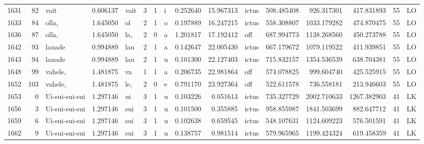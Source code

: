 \begin{tabular}{lrlrllllrrlrrrll}
1631 &          82 &             vait &  0.606137 &    vait &        3 &      1 &       i &      0.252640 &     15.967313 &  ictus &   508.485408 &   926.317301 &   417.831893 &     55 &        LO \\
1633 &          84 &            olla, &  1.645050 &      ol &        2 &      1 &       o &      0.197889 &     16.247215 &  ictus &   558.308807 &  1033.179282 &   474.870475 &     55 &        LO \\
1636 &          87 &            olla, &  1.645050 &     la, &        2 &      0 &       a &      1.201817 &     17.192412 &    off &   687.994773 &  1138.268560 &   450.273788 &     55 &        LO \\
1642 &          93 &           lauade &  0.994889 &     lau &        2 &      1 &       a &      0.142647 &     22.005430 &  ictus &   667.179672 &  1079.119522 &   411.939851 &     55 &        LO \\
1643 &          94 &           lauade &  0.994889 &     lau &        2 &      1 &       u &      0.101300 &     22.127403 &  ictus &   715.832157 &  1354.536539 &   638.704381 &     55 &        LO \\
1648 &          99 &          vahele, &  1.481875 &      va &        1 &      1 &       a &      0.206735 &     22.981864 &    off &   574.078825 &   999.604740 &   425.525915 &     55 &        LO \\
1652 &         103 &          vahele, &  1.481875 &     le, &        2 &      0 &       e &      0.791170 &     23.927364 &    off &   522.611578 &   736.558181 &   213.946603 &     55 &        LO \\
1653 &           0 &   Ui-sui-sui-sui &  1.297146 &      ui &        3 &      1 &       u &      0.103226 &      0.051613 &  ictus &   735.327729 &  2002.710633 &  1267.382903 &     41 &        LK \\
1656 &           3 &   Ui-sui-sui-sui &  1.297146 &     sui &        3 &      1 &       u &      0.101500 &      0.355885 &  ictus &   958.855987 &  1841.503699 &   882.647712 &     41 &        LK \\
1659 &           6 &   Ui-sui-sui-sui &  1.297146 &     sui &        3 &      1 &       u &      0.102638 &      0.659545 &  ictus &   548.107631 &  1124.609223 &   576.501591 &     41 &        LK \\
1662 &           9 &   Ui-sui-sui-sui &  1.297146 &     sui &        3 &      1 &       u &      0.138757 &      0.981514 &  ictus &   579.965965 &  1199.424324 &   619.458359 &     41 &        LK \\

\end{tabular}
